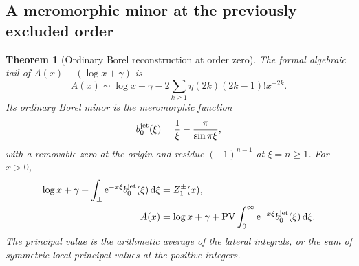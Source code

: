 \documentclass[11pt,a4paper]{article}
\numberwithin{equation}{section}
\newtheorem{theorem}{Theorem}[section]
\theoremstyle{definition}\newtheorem{definition}[theorem]{Definition}
\theoremstyle{remark}\newtheorem{remark}[theorem]{Remark}
\newcommand{\ee}{\mathrm e}\newcommand{\ii}{\mathrm i}\newcommand{\dd}{\,\mathrm d}
\begin{document}
\subsection{A meromorphic minor at the previously excluded order}

\begin{theorem}[Ordinary Borel reconstruction at order zero]
\label{ojf:thm:borelzero}
The formal algebraic tail of $A(x)-(\log x+\gamma)$ is
\begin{equation}\label{ojf:eq:A-asymptotic}
 A(x)\sim\log x+\gamma-
          2\sum_{k\ge1}\eta(2k)(2k-1)!x^{-2k}.
\end{equation}
Its ordinary Borel minor is the meromorphic function
\begin{equation}\label{ojf:eq:b0}
 b_0^{\rm jet}(\xi)=\frac1\xi-\frac\pi{\sin\pi\xi},
\end{equation}
with a removable zero at the origin and residue $(-1)^{n-1}$ at
$\xi=n\ge1$. For $x>0$,
\begin{align}
 \log x+\gamma+\int_\pm\ee^{-x\xi}b_0^{\rm jet}(\xi)\dd\xi
     &=Z_1^\pm(x),\label{ojf:eq:b0-lateral}\\
 A(x)&=\log x+\gamma+
          \PV\int_0^\infty\ee^{-x\xi}b_0^{\rm jet}(\xi)\dd\xi.
                                                        \label{ojf:eq:b0-PV}
\end{align}
The principal value is the arithmetic average of the lateral integrals,
or the sum of symmetric local principal values at the positive integers.
\end{theorem}
\end{document}
